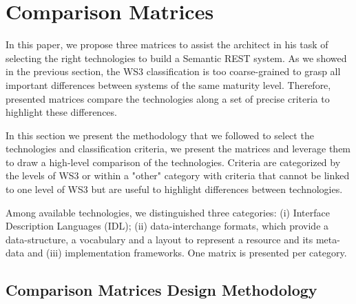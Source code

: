 \section{Comparison Matrices}\label{sec:matrix}



In this paper, we propose three matrices to assist the architect in his task of selecting the right technologies to build a Semantic REST system. As we showed in the previous section, the WS3 classification is too coarse-grained to grasp all important differences between systems of the same maturity level. Therefore, presented matrices compare the technologies along a set of precise criteria to highlight these differences.

In this section we present the methodology that we followed to select the technologies and classification criteria, we present the matrices and leverage them to draw a high-level comparison of the technologies. Criteria are categorized by the levels of WS3 or within a "other" category with criteria that cannot be linked to one level of WS3 but are useful to highlight differences between technologies.

Among available technologies, we distinguished three categories: (i) Interface Description Languages (IDL); (ii) data-interchange formats, which provide a data-structure, a vocabulary and a layout to represent a resource and its meta-data and (iii) implementation frameworks. One matrix is presented per category.

\subsection{Comparison Matrices Design Methodology}



